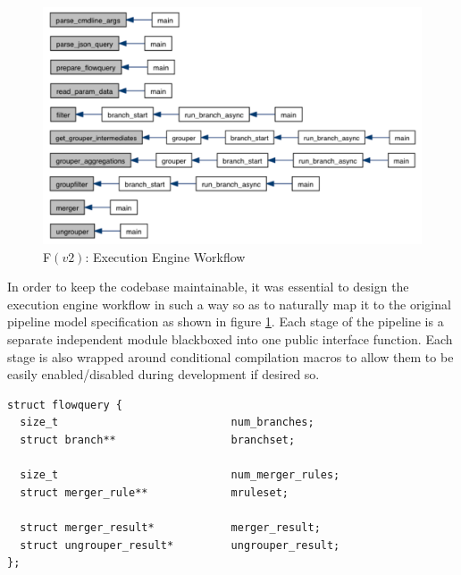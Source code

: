 \begin{figure}[h!]
  \begin{center}
    \includegraphics* [width=1.0\linewidth]{figures/engine-workflow}
    \caption{F$(v2)$: Execution Engine Workflow}
    \label{fig:engine-workflow}
  \end{center}
\end{figure}

In order to keep the codebase maintainable, it was essential to design the
execution engine workflow in such a way so as to naturally map it to the
original pipeline model specification \cite{vmarinov:2009} as shown in figure
\ref{fig:engine-workflow}. Each stage of the pipeline is a separate
independent module blackboxed into one public interface function. Each stage
is also wrapped around conditional compilation macros to allow them to be
easily enabled/disabled during development if desired so.

\begin{lstlisting}
struct flowquery {
  size_t                           num_branches;
  struct branch**                  branchset;

  size_t                           num_merger_rules;
  struct merger_rule**             mruleset;

  struct merger_result*            merger_result;
  struct ungrouper_result*         ungrouper_result;
};
\end{lstlisting}

